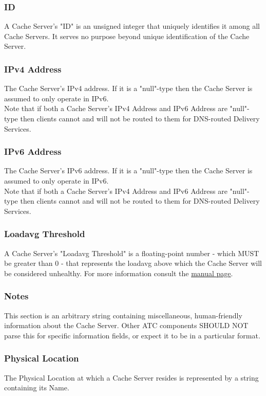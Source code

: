 \subsubsection{ID}
A Cache Server's "ID" is an unsigned integer that uniquely identifies it among
all Cache Servers. It serves no purpose beyond unique identification of the
Cache Server.

\subsubsection{IPv4 Address}
The Cache Server's IPv4 address. If it is a "null"-type then the Cache Server is
assumed to only operate in IPv6.\\
Note that if both a Cache Server's IPv4 Address and IPv6 Address are "null"-type
then clients cannot and will not be routed to them for DNS-routed Delivery
Services.

\subsubsection{IPv6 Address}
The Cache Server's IPv6 address. If it is a "null"-type then the Cache Server is
assumed to only operate in IPv6.\\
Note that if both a Cache Server's IPv4 Address and IPv6 Address are "null"-type
then clients cannot and will not be routed to them for DNS-routed Delivery
Services.

\subsubsection{Loadavg Threshold}
A Cache Server's "Loadavg Threshold" is a floating-point number - which MUST be
greater than 0 - that represents the loadavg above which the Cache Server will
be considered unhealthy. For more information consult the
\href{https://linux.die.net/man/3/getloadavg}{ manual page}.

\subsubsection{Notes}
This section is an arbitrary string containing miscellaneous, human-friendly
information about the Cache Server. Other ATC components SHOULD NOT parse this
for specific information fields, or expect it to be in a particular format.

\subsubsection{Physical Location}
The Physical Location at which a Cache Server resides is represented by a string
containing its Name.


